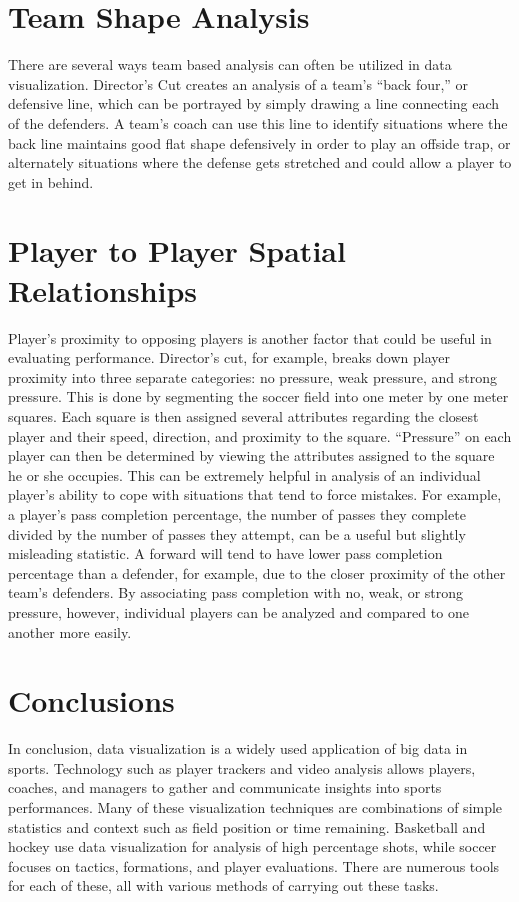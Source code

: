 \documentclass[sigconf]{acmart}
\begin{document}
\section{Team Shape Analysis}There are several ways team based analysis can often be utilized in data visualization. Director’s Cut creates an analysis of a team’s “back four,” or defensive line, which can be portrayed by simply drawing a line connecting each of the defenders. A team’s coach can use this line to identify situations where the back line maintains good flat shape defensively in order to play an offside trap, or alternately situations where the defense gets stretched and could allow a player to get in behind.
\section{Player to Player Spatial Relationships}Player’s proximity to opposing players is another factor that could be useful in evaluating performance. Director’s cut, for example, breaks down player proximity into three separate categories: no pressure, weak pressure, and strong pressure. This is done by segmenting the soccer field into one meter by one meter squares. Each square is then assigned several attributes regarding the closest player and their speed, direction, and proximity to the square. “Pressure” on each player can then be determined by viewing the attributes assigned to the square he or she occupies. This can be extremely helpful in analysis of an individual player’s ability to cope with situations that tend to force mistakes. For example, a player’s pass completion percentage, the number of passes they complete divided by the number of passes they attempt, can be a useful but slightly misleading statistic. A forward will tend to have lower pass completion percentage than a defender, for example, due to the closer proximity of the other team’s defenders. By associating pass completion with no, weak, or strong pressure, however, individual players can be analyzed and compared to one another more easily.
\section{Conclusions}In conclusion, data visualization is a widely used application of big data in sports. Technology such as player trackers and video analysis allows players, coaches, and managers to gather and communicate insights into sports performances. Many of these visualization techniques are combinations of simple statistics and context such as field position or time remaining. Basketball and hockey use data visualization for analysis of high percentage shots, while soccer focuses on tactics, formations, and player evaluations. There are numerous tools for each of these, all with various methods of carrying out these tasks.
\end{document}
